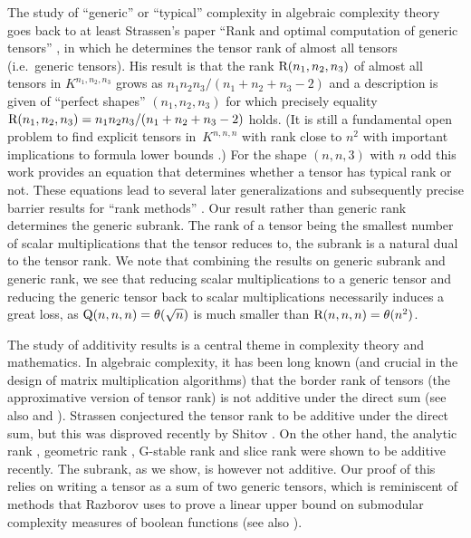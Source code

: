 \documentclass[10pt,a4paper]{article}
\theoremstyle{definition}
\theoremstyle{remark}
\newcommand{\trk}{{\rm R}}
\newcommand{\gensubrank}{{\rm Q}}
\begin{document}
The study of ``generic'' or ``typical'' complexity in algebraic complexity theory goes back to at least Strassen's paper ``Rank and optimal computation of generic tensors'' \cite{MR709378}, in which he determines the tensor rank of almost all tensors (i.e.~generic tensors). His result is that the rank $\trk(n_1,n_2,n_3)$ of almost all tensors in $K^{n_1,n_2,n_3}$ grows as $n_1 n_2 n_3/ (n_1 + n_2 + n_3 - 2)$ and a description is given of ``perfect shapes'' $(n_1, n_2, n_3)$ for which precisely equality $\trk(n_1,n_2,n_3) = n_1 n_2 n_3/ (n_1 + n_2 + n_3 - 2)$ holds. (It is still a fundamental open problem to find explicit tensors in~$K^{n,n,n}$ with rank close to $n^2$ \cite{blaser2014explicit} with important implications to formula lower bounds \cite{raz2013tensor}.) For the shape $(n,n,3)$ with $n$ odd this work provides an equation that determines whether a tensor has typical rank or not. These equations lead to several later generalizations \cite{MR3081636,koiran2020tensor} and subsequently precise barrier results for ``rank methods'' \cite{efremenko2017barriers,DBLP:conf/focs/GargMOW19}. Our result rather than generic rank determines the generic subrank. The rank of a tensor being the smallest number of scalar multiplications that the tensor reduces to, the subrank is a natural dual to the tensor rank. We note that combining the results on generic subrank and generic rank, we see that reducing scalar multiplications to a generic tensor and reducing the generic tensor back to scalar multiplications necessarily induces a great loss, as $\gensubrank(n,n,n) = \theta(\sqrt{n})$ is much smaller than $\trk(n,n,n) = \theta(n^2)$.

%

The study of additivity results is a central theme in complexity theory and mathematics. In algebraic complexity, it has been long known (and crucial in the design of matrix multiplication algorithms) that the border rank of tensors (the approximative version of tensor rank) is not additive under the direct sum \cite{schonhage1981partial} (see also \cite[Lemma~7.1]{blaser2013fast} and \cite[(15.12)]{burgisser1997algebraic}). Strassen conjectured the tensor rank to be additive under the direct sum, but this was disproved recently by Shitov \cite{MR3974478}. On the other hand, the analytic rank \cite{lovett2019analytic}, geometric rank \cite{DBLP:conf/coco/KoppartyMZ20}, G-stable rank \cite{derksen2020gstable} and slice rank \cite{gowers2021slice} were shown to be additive recently. The subrank, as we show, is however not additive. Our proof of this relies on writing a tensor as a sum of two generic tensors, which is reminiscent of methods that Razborov \cite{razborov1992submodular} uses to prove a linear upper bound on submodular complexity measures of boolean functions (see also \cite{DBLP:journals/eccc/RobereZ21}).
\end{document}
